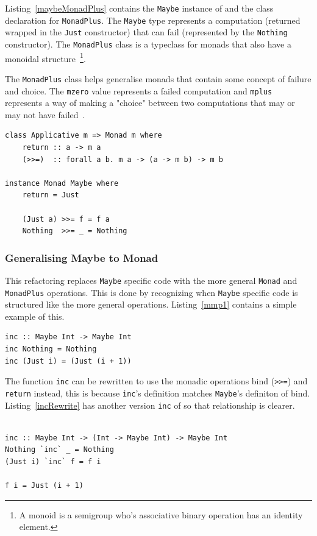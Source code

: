 Listing~\ref{maybeMonadPlus} contains the \texttt{Maybe} instance of and the class declaration for \texttt{MonadPlus}. The \texttt{Maybe} type represents a computation (returned wrapped in the \texttt{Just} constructor) that can fail (represented by the \texttt{Nothing} constructor). The \texttt{MonadPlus} class is a typeclass for monads that also have a monoidal structure~\footnote{A monoid is a semigroup who's associative binary operation has an identity element.}. 

The \texttt{MonadPlus} class helps generalise monads that contain some concept of failure and choice. The \texttt{mzero} value represents a failed computation and \texttt{mplus} represents a way of making a "choice" between two computations that may or may not have failed~\citep{typeclassopedia}. 

\begin{lstlisting}[caption={\texttt{Maybe}'s monad definition}, label=maybeMonad]
class Applicative m => Monad m where
	return :: a -> m a
    (>>=)  :: forall a b. m a -> (a -> m b) -> m b
    
instance Monad Maybe where
	return = Just
	
	(Just a) >>= f = f a
	Nothing  >>= _ = Nothing
\end{lstlisting}

\subsubsection{Generalising Maybe to Monad}\label{genMonad}

This refactoring replaces \texttt{Maybe} specific code with the more general \texttt{Monad} and \texttt{MonadPlus} operations. This is done by recognizing when \texttt{Maybe} specific code is structured like the more general operations. Listing~\ref{mmp1} contains a simple example of this.  

\begin{lstlisting}[caption={\texttt{inc}},label=mmp1]
inc :: Maybe Int -> Maybe Int
inc Nothing = Nothing
inc (Just i) = (Just (i + 1))
\end{lstlisting}

The function \texttt{inc} can be rewritten to use the monadic operations bind (\texttt{>>=}) and \texttt{return} instead, this is because \texttt{inc}'s definition matches \texttt{Maybe}'s definiton of bind. Listing~\ref{incRewrite} has another version \texttt{inc} of so that relationship is clearer. 

\begin{lstlisting}[caption={\texttt{inc} rewritten to look more like bind},label=incRewrite]

inc :: Maybe Int -> (Int -> Maybe Int) -> Maybe Int
Nothing `inc` _ = Nothing
(Just i) `inc` f = f i

f i = Just (i + 1)
\end{lstlisting}


